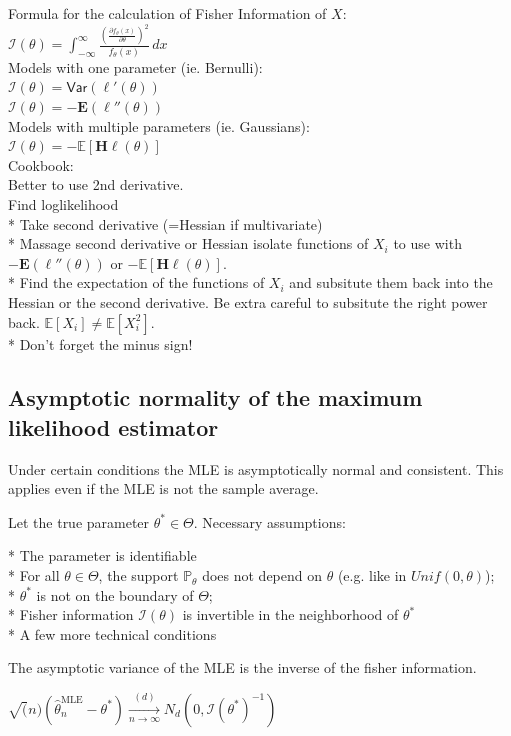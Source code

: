 Formula for the calculation of Fisher Information of $X$:\\

$\mathcal{I}(\theta )= \int _{-\infty }^\infty \frac{\left(\frac{\partial f_\theta (x)}{\partial \theta }\right)^2}{f_\theta (x)} \,  dx$ \\

Models with one parameter (ie. Bernulli):\\

$\mathcal{I}(\theta ) = \textsf{Var}(\ell '(\theta ))$\\

$\mathcal{I}(\theta ) = - \mathbf{E}(\ell ''(\theta ))$\\

Models with multiple parameters (ie. Gaussians):\\

$\mathcal{I}(\theta ) = -\mathbb E\left[\mathbf{H}\ell (\theta )\right]$\\

Cookbook:\\

Better to use 2nd derivative.\\
Find loglikelihood\\
* Take second derivative (=Hessian if multivariate)\\
* Massage second derivative or Hessian isolate functions of $X_i$ to use with $- \mathbf{E}(\ell ''(\theta ))$ or $-\mathbb E\left[\mathbf{H}\ell (\theta )\right]$.\\
* Find the expectation of the functions of $X_i$ and subsitute them back into the Hessian or the second derivative. Be extra careful to subsitute the right power back. $\mathbb{E}[X_i] \neq \mathbb{E}[X_i^2]$.\\
* Don't forget the minus sign!
\subsection{Asymptotic normality of the maximum likelihood estimator}

Under certain conditions the MLE is asymptotically normal and consistent. This applies even if the MLE is not the sample average.

Let the true parameter $\theta^{*} \in \Theta$. Necessary assumptions:

* The parameter is identifiable\\
* For all $\theta \in \Theta$, the support $\mathbb{P}_{\theta}$ does not depend on $\theta$ (e.g. like in $Unif(0,\theta)$);\\
* $\theta^{*}$ is not on the boundary of $\Theta$;\\
* Fisher information $\mathcal{I}(\theta)$  is invertible in the neighborhood of $\theta^{*}$\\
* A few more technical conditions

The asymptotic variance of the MLE is the inverse of the fisher information.

$\sqrt(n)(\widehat{\theta }_ n^{\text {MLE}} - \theta^*) \xrightarrow[n \rightarrow \infty]{(d)} N_d(0,\mathcal{I}(\theta^* )^{-1})$\\